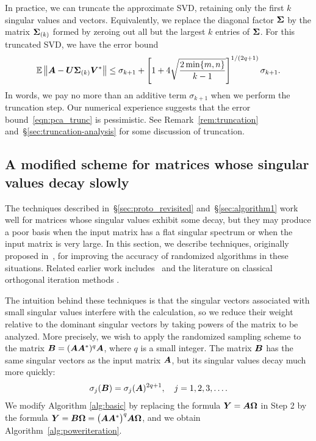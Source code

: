 \documentclass{article}
\begin{document}
In practice, we can truncate the approximate SVD, retaining only the
first $k$ singular values and vectors.  Equivalently, we
replace the diagonal factor $\bm{\Sigma}$ by the matrix
$\bm{\Sigma}_{(k)}$ formed by zeroing out all but the
largest $k$ entries of $\bm{\Sigma}$.  For this truncated SVD, we have the error bound
\begin{equation} \label{eqn:pca_trunc}
\operatorname{\mathbb{E}} \left\Vert { \bm{A} - \bm{U} \bm{\Sigma}_{(k)} \bm{V}^*} \right\Vert
	\leq \sigma_{k+1} + \left[ 1 + 4 \sqrt{\frac{2\min\{m,n\}}{k-1}} \right]^{1/(2q+1)} \sigma_{k+1}.
\end{equation}
In words, we pay no more than an additive term $\sigma_{k+1}$ when we
perform the truncation step.  Our numerical experience suggests that
the error bound~\eqref{eqn:pca_trunc} is pessimistic.
See Remark~\ref{rem:truncation} and~\S\ref{sec:truncation-analysis} for some
discussion of truncation.


\subsection{A modified scheme for matrices whose singular values decay slowly}
\label{sec:powerscheme}

The techniques described in~\S\ref{sec:proto_revisited} and~\S\ref{sec:algorithm1}
work well for matrices whose singular values exhibit some decay,
but they may produce a poor basis when the input matrix has a flat singular spectrum
or when the input matrix is very large. In this section, we describe techniques,
originally proposed in~\cite{tygert_szlam}, for improving the accuracy
of randomized algorithms in these situations.
Related earlier work includes~\cite{roweis} and the literature on
classical orthogonal iteration methods \cite[p.~332]{golub}.

The intuition behind these techniques is that
the singular vectors associated with small singular values
interfere with the calculation, so we reduce their weight relative to
the dominant singular vectors by taking powers of the matrix to be analyzed.
More precisely, we wish to apply the randomized sampling scheme
to the matrix $\bm{B} = (\bm{A}\bm{A}^*)^q \bm{A}$, where $q$ is a
small integer.  The matrix $\bm{B}$ has the same singular vectors as
the input matrix $\bm{A}$, but its singular values decay much more quickly:
\begin{equation}
\label{eq:svds_of_B}
\sigma_j( \bm{B} ) = \sigma_j( \bm{A} )^{2q+1},
\quad j = 1, 2, 3, \dots.
\end{equation}
We modify Algorithm \ref{alg:basic} by replacing the formula $\bm{Y} = \bm{A}\bm{\Omega}$
in Step 2 by the formula
$\bm{Y} = \bm{B}\bm{\Omega} = \bigl(\bm{A}\bm{A}^{*}\bigr)^{q}\bm{A}\bm{\Omega}$,
and we obtain Algorithm~\ref{alg:poweriteration}.
\end{document}
